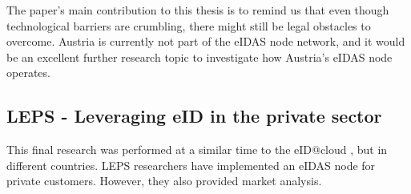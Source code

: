 The paper's main contribution to this thesis is to remind us that even though technological barriers are crumbling, there might still be legal obstacles to overcome. Austria is currently not part of the eIDAS node network, and it would be an excellent further research topic to investigate how Austria's eIDAS node operates.






\subsection{LEPS - Leveraging eID in the private sector}

This final research \cite{Martin2019303} was performed at a similar time to the eID@cloud \cite{guerola2019eid}, but in different countries. LEPS researchers 
have implemented an eIDAS node for private customers. However, they also provided market analysis.

